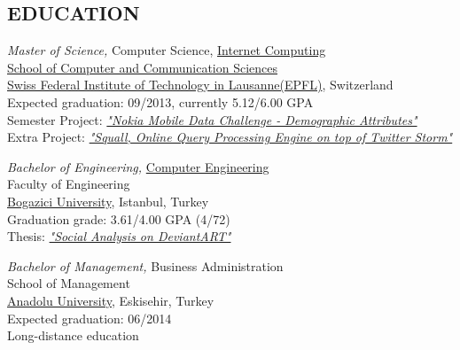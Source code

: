 \documentclass[line, margin]{res}
\begin{document}
\address{Avenue de Rhodanie 64 Chambre 524, 1007 Lausanne Switzerland, (+41) 78 926 9917}
\address{\href{mailto:ferhat.elmas@epfl.ch}{ferhat.elmas@epfl.ch} \hspace{1.75cm} \href{http://ferhatelmas.com}{ferhatelmas.com} \hspace{1.75cm}  \href{https://github.com/ferhatelmas}{github.com/ferhatelmas}}
 
\begin{resume}
 
\vspace{-0.4cm} 
  
\section{EDUCATION}
	{\sl Master of Science,} Computer Science, \href{http://ic.epfl.ch/specializations#content}{Internet Computing} \\
	\href{http://ic.epfl.ch}{School of Computer and Communication Sciences} \\
	\href{http://epfl.ch}{Swiss Federal Institute of Technology in Lausanne(EPFL)}, Switzerland \\
	Expected graduation: 09/2013, currently 5.12/6.00 GPA \\
	Semester Project: \textit{\href{http://research.nokia.com/page/12000}{"Nokia Mobile Data Challenge - Demographic Attributes"}} \\
	Extra Project: \textit{\href{https://github.com/epfldata/squall}{"Squall, Online Query Processing Engine on top of Twitter Storm"}}
 
	{\sl Bachelor of Engineering,} \href{http://www.cmpe.boun.edu.tr/}{Computer Engineering} \\
	Faculty of Engineering \\
	\href{http://boun.edu.tr/en-US/Content/Default.aspx}{Bogazici University}, Istanbul, Turkey \\
	Graduation grade: 3.61/4.00 GPA (4/72) \\
	Thesis: \textit{\href{https://github.com/ferhatelmas/deviantART-analysis}{"Social Analysis on DeviantART"}}
 
	{\sl Bachelor of Management,}  Business Administration \\
	School of Management \\
	\href{http://www.anadolu.edu.tr/en/}{Anadolu University}, Eskisehir, Turkey \\          
	Expected graduation: 06/2014 \\        
	Long-distance education


\end{resume}
\end{document}
